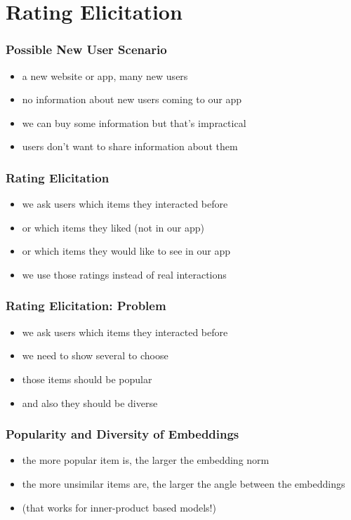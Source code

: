 \documentclass[t]{beamer}
\begin{document}
\section{Rating Elicitation}
\begin{frame}
  \frametitle{Possible New User Scenario}
  \begin{itemize}
  \item a new website or app, many new users
  \item no information about new users coming to our app
  \item we can buy some information but that's impractical
  \item users don't want to share information about them
  \end{itemize}
\end{frame}
\begin{frame}
  \frametitle{Rating Elicitation}
  \begin{itemize}
  \item we ask users which items they interacted before
  \item or which items they liked (not in our app)
  \item or which items they would like to see in our app
  \item we use those ratings instead of real interactions
  \end{itemize}
\end{frame}
\begin{frame}
  \frametitle{Rating Elicitation: Problem}
  \begin{itemize}
  \item we ask users which items they interacted before
  \item we need to show several to choose
  \item those items should be popular
  \item and also they should be diverse
  \end{itemize}
\end{frame}
\begin{frame}
  \frametitle{Popularity and Diversity of Embeddings}
  \begin{itemize}
  \item the more popular item is, the larger the embedding norm
  \item the more unsimilar items are, the larger the angle between the embeddings
  \item (that works for inner-product based models!)
  \end{itemize}
\end{frame}
\end{document}
